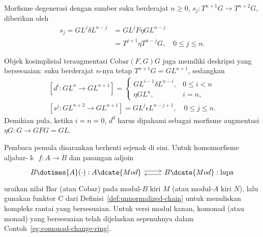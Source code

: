 \begin{example}
	Morfisme degenerasi dengan sumber suku berderajat $n\geq0$,
	$s_j:T^{n+1}G\to T^{n+2}G$, diberikan oleh
	\begin{align*}
		s_j = G L^j \delta L^{n-j} & =
		G L^j F \eta G L^{n-j} \\
		& = T^{j+1} \eta T^{n-j} G, \quad 0 \leq j \leq n.
	\end{align*}

	Objek kosimplisial teraugmentasi $\mathrm{Cobar}(F,G)G$ juga memiliki
	deskripsi yang bersesuaian: suku berderajat $n$-nya tetap
	$T^{n+1}G=GL^{n+1}$, sedangkan
	\begin{gather*}
		\left[ d^i: GL^n \to GL^{n+1} \right] =
		\begin{cases}
			GL^{i-1} \delta L^{n-i}, & 0 \leq i < n \\
			\eta GL^n , & i = n,
		\end{cases} \\
		\left[ s^j: GL^{n+2} \to GL^{n+1} \right] =
		GL^j \epsilon L^{n-j+1}, \quad 0 \leq j \leq n.
	\end{gather*}
	Demikian pula, ketika $i=n=0$, $d^0$ harus dipahami sebagai morfisme
	augmentasi $\eta G:G\to GFG=GL$.
\end{example}

Pembaca pemula disarankan berhenti sejenak di sini. Untuk homomorfisme
aljabar-$\Bbbk$ $f:A\to B$ dan pasangan adjoin
\[\begin{tikzcd}
	B \dotimes{A} (\cdot): A\dcate{Mod} \arrow[shift left, r] & B\dcate{Mod}: \text{lupa} \arrow[shift left, l]
\end{tikzcd}\]
uraikan nilai $\mathrm{Bar}$ (atau $\mathrm{Cobar}$) pada modul-$B$ kiri
$M$ (atau modul-$A$ kiri $N$), lalu gunakan funktor $\mathrm{C}$ dari
Definisi~\ref{def:unnormalized-chain} untuk menuliskan kompleks rantai
yang bersesuaian. Untuk versi modul kanan, komonad (atau monad) yang
bersesuaian telah dijelaskan sepenuhnya dalam
Contoh~\ref{eg:comonad-change-ring}.

